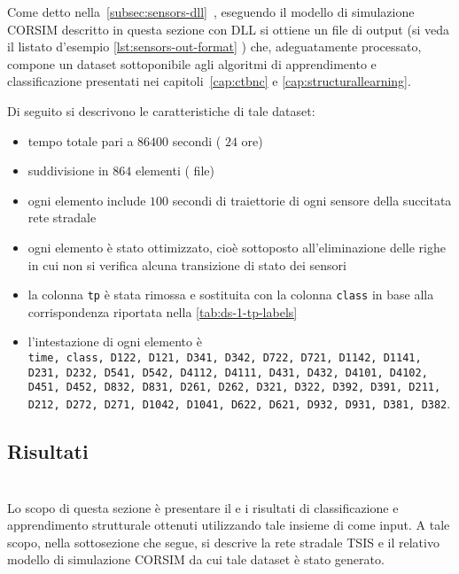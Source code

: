 Come detto nella~\autoref{subsec:sensors-dll}~, eseguendo il modello di simulazione \acs{CORSIM} descritto in questa sezione con  \acs{DLL} si ottiene un file di output (si veda il listato d'esempio \ref{lst:sensors-out-format} ) che, adeguatamente processato, compone un dataset sottoponibile agli algoritmi di apprendimento e classificazione presentati nei capitoli~\ref{cap:ctbnc} e \ref{cap:structurallearning}.

Di seguito si descrivono le caratteristiche di tale dataset:
\begin{itemize}
	\item tempo totale pari a $86400$ secondi (\ie{} $24$ ore)
	\item suddivisione in $864$ elementi (\ie{} file)
	\item ogni elemento include $100$ secondi di traiettorie di ogni sensore della succitata rete stradale
	\item ogni elemento è stato ottimizzato, cioè sottoposto all'eliminazione delle righe in cui non si verifica alcuna transizione di stato dei sensori
	\item la colonna \lstinline[]|tp| è stata rimossa e sostituita con la colonna \lstinline[]|class| in base alla corrispondenza riportata nella \vref{tab:ds-1-tp-labels}
	\item l'intestazione di ogni elemento è \\ \lstinline[]|time, class, D122, D121, D341, D342, D722, D721, D1142, D1141, D231, D232, D541, D542, D4112, D4111, D431, D432, D4101, D4102, D451, D452, D832, D831, D261, D262, D321, D322, D392, D391, D211, D212, D272, D271, D1042, D1041, D622, D621, D932, D931, D381, D382|.
\end{itemize}

\subsection{Risultati}

\section{}\label{sec:dataset-2}
Lo scopo di questa sezione è presentare il  e i risultati di classificazione e apprendimento strutturale ottenuti utilizzando tale insieme di \emph{} come input. A tale scopo, nella sottosezione che segue, si descrive la rete stradale \acs{TSIS} e il relativo modello di simulazione \acs{CORSIM} da cui tale dataset è stato generato.

